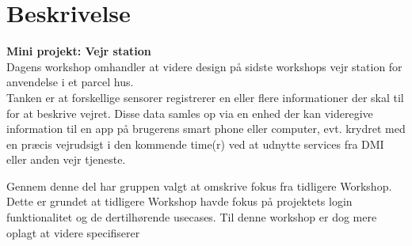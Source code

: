 \documentclass[11pt]{article}
\renewcommand{\baselinestretch}{1.20}
\begin{document}
    
    
    
    \renewcommand{\baselinestretch}{0.8}
    \tableofcontents
    \renewcommand{\baselinestretch}{1.20}
    
    \section{Beskrivelse}
    \textbf{Mini projekt: Vejr station}\\
    Dagens workshop omhandler at videre design på sidste workshops vejr station for anvendelse i et parcel hus. \\
    Tanken er at forskellige sensorer registrerer en eller flere informationer der skal til for at beskrive
    vejret. Disse data samles op via en enhed der kan videregive information til en app på brugerens smart
    phone eller computer, evt. krydret med en præcis vejrudsigt i den kommende time(r) ved at udnytte services fra DMI
    eller anden vejr tjeneste.
    
    Gennem denne del har gruppen valgt at omskrive fokus fra tidligere Workshop. Dette er grundet at tidligere Workshop havde fokus på projektets login funktionalitet og de dertilhørende usecases. Til denne workshop er dog mere oplagt at videre specifiserer  
    
    \newpage
    
    
    \newpage
    
\end{document}
